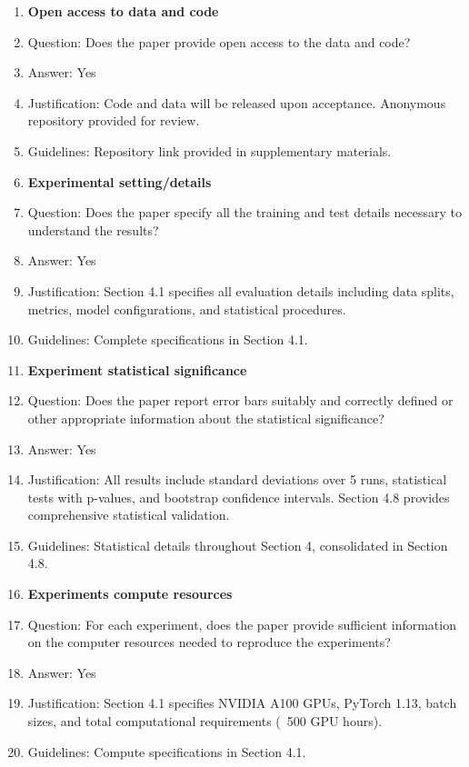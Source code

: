\documentclass{article}
\begin{document}
\begin{enumerate}
\item {\bf Open access to data and code}
    \item[] Question: Does the paper provide open access to the data and code?
    \item[] Answer: Yes
    \item[] Justification: Code and data will be released upon acceptance. Anonymous repository provided for review.
    \item[] Guidelines: Repository link provided in supplementary materials.

\item {\bf Experimental setting/details}
    \item[] Question: Does the paper specify all the training and test details necessary to understand the results?
    \item[] Answer: Yes
    \item[] Justification: Section 4.1 specifies all evaluation details including data splits, metrics, model configurations, and statistical procedures.
    \item[] Guidelines: Complete specifications in Section 4.1.

\item {\bf Experiment statistical significance}
    \item[] Question: Does the paper report error bars suitably and correctly defined or other appropriate information about the statistical significance?
    \item[] Answer: Yes
    \item[] Justification: All results include standard deviations over 5 runs, statistical tests with p-values, and bootstrap confidence intervals. Section 4.8 provides comprehensive statistical validation.
    \item[] Guidelines: Statistical details throughout Section 4, consolidated in Section 4.8.

\item {\bf Experiments compute resources}
    \item[] Question: For each experiment, does the paper provide sufficient information on the computer resources needed to reproduce the experiments?
    \item[] Answer: Yes
    \item[] Justification: Section 4.1 specifies NVIDIA A100 GPUs, PyTorch 1.13, batch sizes, and total computational requirements (~500 GPU hours).
    \item[] Guidelines: Compute specifications in Section 4.1.


\end{enumerate}
\end{document}
